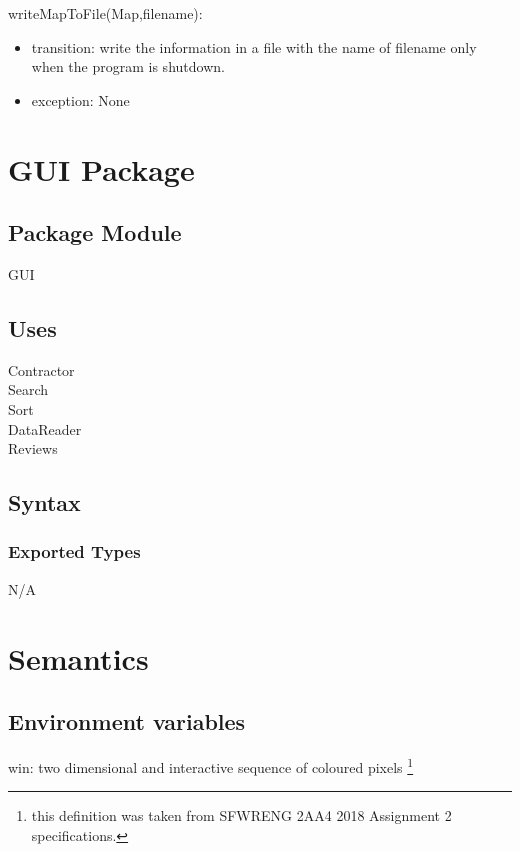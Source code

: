 \documentclass[12pt]{scrartcl}
\begin{document}
writeMapToFile(Map,filename):
\begin{itemize}
\item transition: write the information in a file with the name of filename only when the program is shutdown.
\item exception: None
\end{itemize}


\newpage

\section {GUI Package}

\subsection{Package Module}

GUI

\subsection {Uses}

Contractor \\
Search \\
Sort \\
DataReader \\
Reviews \\

\subsection {Syntax}

\subsubsection {Exported Types}

N/A

\section {Semantics}

\subsection{Environment variables}

win: two dimensional and interactive sequence of coloured pixels \footnote{this definition was taken from SFWRENG 2AA4 2018 Assignment 2 specifications.}
\end{document}
